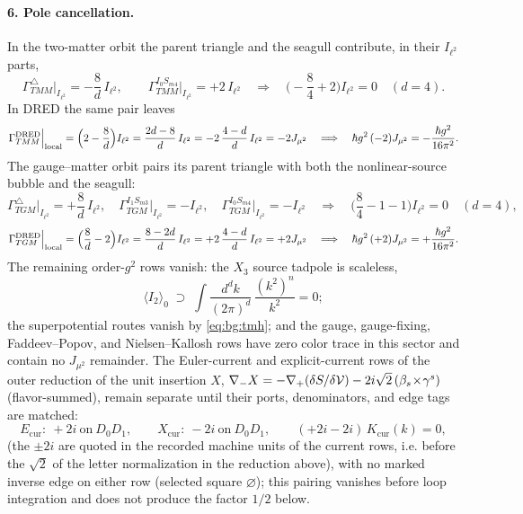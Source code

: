 \paragraph{6. Pole cancellation.} In the two-matter orbit the parent triangle and the seagull contribute, in their
$I_{\ell^{2}}$ parts,
\begin{equation}\label{eq:bg:tmmpole}
\Gamma^{\triangle}_{TMM}\Big|_{I_{\ell^{2}}}=-\frac8d\,I_{\ell^{2}}, \qquad \Gamma^{I_{0}S_{m4}}_{TMM}\Big|_{I_{\ell^{2}}}=+2\,I_{\ell^{2}} \quad\Longrightarrow\quad \Big(-\frac84+2\Big)I_{\ell^{2}}=0 \quad(d=4) .
\end{equation}
In DRED the same pair leaves
\begin{equation}\label{eq:bg:tmmdred}
\Gamma^{\mathrm{DRED}}_{TMM}\Big|_{\mathrm{local}} =\Big(2-\frac8d\Big)I_{\ell^{2}} =\frac{2d-8}{d}\,I_{\ell^{2}} =-2\,\frac{4-d}{d}\,I_{\ell^{2}} =-2J_{\mu^{2}} \quad\Longrightarrow\quad \hbar g^{2}\,(-2)J_{\mu^{2}} =-\frac{\hbar g^{2}}{16\pi^{2}} .
\end{equation}
The gauge--matter orbit pairs its parent triangle with both the nonlinear-source bubble and the seagull:
\begin{equation}\label{eq:bg:tmpole}
\Gamma^{\triangle}_{TGM}\Big|_{I_{\ell^{2}}}=+\frac8d\,I_{\ell^{2}}, \quad \Gamma^{I_{1}S_{m3}}_{TGM}\Big|_{I_{\ell^{2}}}=-I_{\ell^{2}}, \quad \Gamma^{I_{0}S_{m4}}_{TGM}\Big|_{I_{\ell^{2}}}=-I_{\ell^{2}} \quad\Longrightarrow\quad \Big(\frac84-1-1\Big)I_{\ell^{2}}=0 \quad(d=4) ,
\end{equation}
\begin{equation}\label{eq:bg:tmdred}
\Gamma^{\mathrm{DRED}}_{TGM}\Big|_{\mathrm{local}} =\Big(\frac8d-2\Big)I_{\ell^{2}} =\frac{8-2d}{d}\,I_{\ell^{2}} =+2\,\frac{4-d}{d}\,I_{\ell^{2}} =+2J_{\mu^{2}} \quad\Longrightarrow\quad \hbar g^{2}\,(+2)J_{\mu^{2}} =+\frac{\hbar g^{2}}{16\pi^{2}} .
\end{equation}
The remaining order-$g^{2}$ rows vanish: the $X_{3}$ source tadpole is scaleless,
\begin{equation}\label{eq:bg:tadpole}
\langle I_{2}\rangle_{0} \;\supset\; \int\!\frac{d^{d}k}{(2\pi)^{d}}\,\frac{(k^{2})^{n}}{k^{2}}=0 ;
\end{equation}
the superpotential routes vanish by \eqref{eq:bg:tmh}; and the gauge, gauge-fixing, Faddeev--Popov, and
Nielsen--Kallosh rows have zero color trace in this sector and contain no $J_{\mu^{2}}$ remainder. The
Euler-current and explicit-current rows of the outer reduction of the unit insertion
$X$, $\nabla_{-}X=-\nabla_{+}(\delta
S/\delta\mathcal{V})-2i\sqrt2\,(\beta_{s}\!\times\!\gamma^{s})$ (flavor-summed), remain separate until their ports, denominators,
and edge tags are matched:
\begin{equation}\label{eq:bg:current}
E_{\mathrm{cur}}:\ +2i\ \text{on}\ D_{0}D_{1}, \qquad X_{\mathrm{cur}}:\ -2i\ \text{on}\ D_{0}D_{1}, \qquad (+2i-2i)\,K_{\mathrm{cur}}(k)=0 ,
\end{equation}
(the $\pm2i$ are quoted in the recorded machine units of the current rows,
i.e. before the $\sqrt2$ of the letter normalization in the reduction above),
with no marked inverse edge on either row (selected square $\varnothing$); this pairing vanishes before loop
integration and does not produce the factor $1/2$ below.


